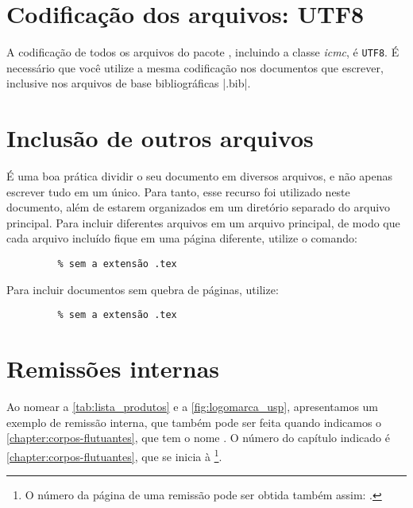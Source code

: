 

\section{Codificação dos arquivos: UTF8}

A codificação de todos os arquivos do pacote \abnTeX, incluindo a classe \textit{icmc}, é \texttt{UTF8}. É necessário que
você utilize a mesma codificação nos documentos que escrever, inclusive nos
arquivos de base bibliográficas |.bib|.



\section{Inclusão de outros arquivos}\label{sec-include}

É uma boa prática dividir o seu documento em diversos arquivos, e não
apenas escrever tudo em um único. Para tanto, esse recurso foi utilizado neste
documento, além de estarem organizados em um diretório separado do arquivo principal. Para incluir diferentes arquivos em um arquivo principal,
de modo que cada arquivo incluído fique em uma página diferente, utilize o
comando:

\begin{verbatim}
         % sem a extensão .tex
\end{verbatim}

Para incluir documentos sem quebra de páginas, utilize:

\begin{verbatim}
         % sem a extensão .tex
\end{verbatim}



\section{Remissões internas}

Ao nomear a \autoref{tab:lista_produtos} e a \autoref{fig:logomarca_usp}, apresentamos um exemplo de remissão interna, que também pode ser feita quando indicamos o \autoref{chapter:corpos-flutuantes}, que tem o nome \emph{}. O número do capítulo indicado é \ref{chapter:corpos-flutuantes}, que se inicia à \footnote{O número da página de uma remissão pode ser obtida também assim:
\pageref{chapter:corpos-flutuantes}.}.

